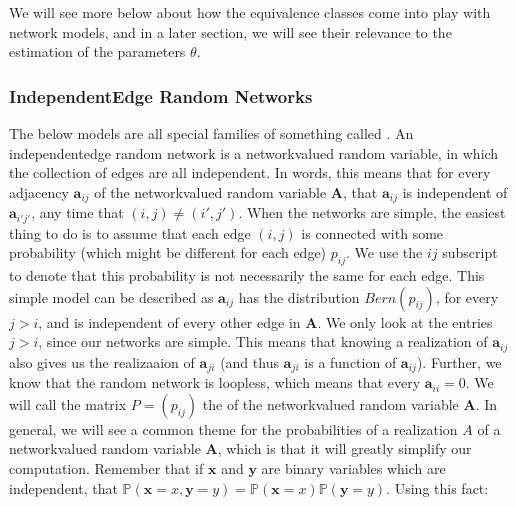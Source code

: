 \documentclass[letterpaper,10pt,english]{jupyterBook}
\begin{document}
\sphinxAtStartPar
We will see more below about how the equivalence classes come into play with network models, and in a later section, we will see their relevance to the estimation of the parameters \(\theta\).


\subsubsection{Independent\sphinxhyphen{}Edge Random Networks}
\label{\detokenize{representations/ch5/single-network-models_theory:independent-edge-random-networks}}\label{\detokenize{representations/ch5/single-network-models_theory:representations-whyuse-networkmodels-iern}}
\sphinxAtStartPar
The below models are all special families of something called . An independent\sphinxhyphen{}edge random network is a network\sphinxhyphen{}valued random variable, in which the collection of edges are all independent. In words, this means that for every adjacency \(\mathbf a_{ij}\) of the network\sphinxhyphen{}valued random variable \(\mathbf A\), that \(\mathbf a_{ij}\) is independent of \(\mathbf a_{i'j'}\), any time that \((i,j) \neq (i',j')\). When the networks are simple, the easiest thing to do is to assume that each edge \((i,j)\) is connected with some probability (which might be different for each edge) \(p_{ij}\). We use the \(ij\) subscript to denote that this probability is not necessarily the same for each edge. This simple model can be described as \(\mathbf a_{ij}\) has the distribution \(Bern(p_{ij})\), for every \(j > i\), and is independent of every other edge in \(\mathbf A\). We only look at the entries \(j > i\), since our networks are simple. This means that knowing a realization of \(\mathbf a_{ij}\) also gives us the realizaaion of \(\mathbf a_{ji}\) (and thus \(\mathbf a_{ji}\) is a  function of \(\mathbf a_{ij}\)). Further, we know that the random network is loopless, which means that every \(\mathbf a_{ii} = 0\). We will call the matrix \(P = (p_{ij})\) the  of the network\sphinxhyphen{}valued random variable \(\mathbf A\). In general, we will see a common theme for the probabilities of a realization \(A\) of a network\sphinxhyphen{}valued random variable \(\mathbf A\), which is that it will greatly simplify our computation. Remember that if \(\mathbf x\) and \(\mathbf y\) are binary variables which are independent, that \(\mathbb P(\mathbf x = x, \mathbf y = y) = \mathbb P(\mathbf x = x) \mathbb P(\mathbf y = y)\). Using this fact:
\end{document}

